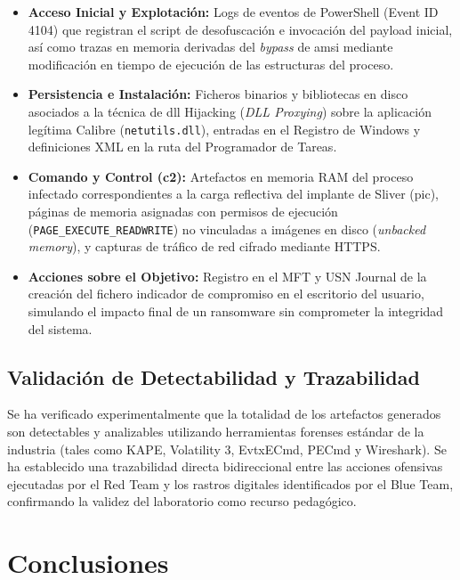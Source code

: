 \begin{itemize}
    \item \textbf{Acceso Inicial y Explotación:} Logs de eventos de PowerShell (Event ID 4104) que registran el script de desofuscación e invocación del payload inicial, así como trazas en memoria derivadas del \textit{bypass} de \acrshort{amsi} mediante modificación en tiempo de ejecución de las estructuras del proceso.
    
    \item \textbf{Persistencia e Instalación:} Ficheros binarios y bibliotecas en disco asociados a la técnica de \acrshort{dll} Hijacking (\textit{DLL Proxying}) sobre la aplicación legítima Calibre (\texttt{netutils.dll}), entradas en el Registro de Windows y definiciones XML en la ruta del Programador de Tareas.
    
    \item \textbf{Comando y Control (\acrshort{c2}):} Artefactos en memoria RAM del proceso infectado correspondientes a la carga reflectiva del implante de Sliver (\acrshort{pic}), páginas de memoria asignadas con permisos de ejecución (\texttt{PAGE\_EXECUTE\_READWRITE}) no vinculadas a imágenes en disco (\textit{unbacked memory}), y capturas de tráfico de red cifrado mediante HTTPS.
    
    \item \textbf{Acciones sobre el Objetivo:} Registro en el MFT y USN Journal de la creación del fichero indicador de compromiso en el escritorio del usuario, simulando el impacto final de un ransomware sin comprometer la integridad del sistema.
\end{itemize}

\subsection{Validación de Detectabilidad y Trazabilidad}

Se ha verificado experimentalmente que la totalidad de los artefactos generados son detectables y analizables utilizando herramientas forenses estándar de la industria (tales como KAPE, Volatility 3, EvtxECmd, PECmd y Wireshark). Se ha establecido una trazabilidad directa bidireccional entre las acciones ofensivas ejecutadas por el Red Team y los rastros digitales identificados por el Blue Team, confirmando la validez del laboratorio como recurso pedagógico.

\section{Conclusiones}

